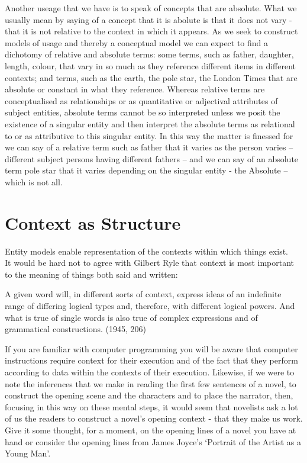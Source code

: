\noindent Another useage that we have is to speak of concepts that are absolute. What we usually mean by saying of a concept that it is abolute is that 
it does not vary - that it is not relative to the context in which it appears. As we seek to construct models of usage and thereby a conceptual model we can expect to find a dichotomy of relative and absolute terms: some terms, such as father, daughter, length, colour, that vary in so much as they reference different items in different contexts; and terms, such as the earth, the pole star, the London Times that are absolute or constant in what they reference. Whereas relative terms are conceptualised as relationships or as quantitative or adjectival attributes of subject entities, absolute terms cannot be so interpreted unless we posit the existence of a singular entity and then interpret the absolute terms as relational to or as attributive to this singular entity. In this way the matter is finessed for we can say of a relative term such as father that it varies as the person varies -- different subject persons having different fathers -- and we can say of an absolute term pole star that it varies depending on the singular entity - the Absolute -- which is not all. 

\section{Context as Structure}
\noindent Entity models enable representation of the contexts within which things exist.\\

\noindent It would be hard not to agree with Gilbert Ryle that context is most important to the meaning of things both said and written:
\begin{erquote}
A given word will, in different sorts of context, express ideas of an indefinite range of differing logical types and, therefore, with different logical powers. And what is true of single words is also true of complex expressions and of grammatical constructions.
(1945, 206)
\end{erquote}

\noindent If you are familiar with computer programming you will be aware that computer instructions 
require context for their execution and of the fact that they perform according to data within 
the contexts of their execution. Likewise, if we were to note the inferences that we make in 
reading the first few sentences of a novel, to construct the opening scene and the characters and 
to place the narrator, then, focusing in this way on these mental steps, it would seem that 
novelists ask a lot of us the readers to construct a novel's opening context - that they make 
us work. Give it some thought, for a moment, on the opening lines of a novel you have at hand
or consider the opening lines from James Joyce's `Portrait of the Artist as a Young Man'.

